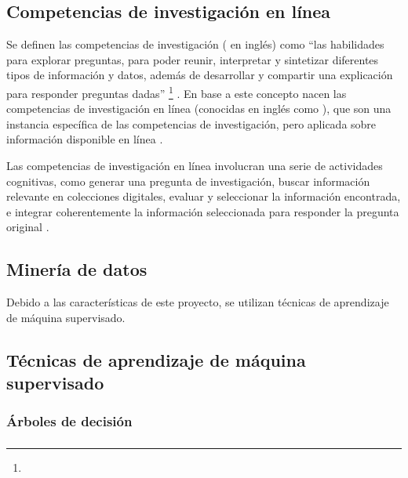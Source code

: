 \subsection{Competencias de investigación en línea}
\label{subsec:competencias}
Se definen las competencias de investigación ( en inglés) como “las habilidades para explorar preguntas, para poder reunir, interpretar y sintetizar diferentes tipos de información y datos, además de desarrollar y compartir una explicación para responder preguntas dadas” \footnote{\traduccionlibre} \parencite[p.~13]{national2000inquiry}. En base a este concepto nacen las competencias de investigación en línea (conocidas en inglés como ), que son una instancia específica de las competencias de investigación, pero aplicada sobre información disponible en línea \parencite{quintana2005framework}.

Las competencias de investigación en línea involucran una serie de actividades cognitivas, como generar una pregunta de investigación, buscar información relevante en colecciones digitales, evaluar y seleccionar la información encontrada, e integrar coherentemente la información seleccionada para responder la pregunta original \parencite{eisenberg1990information}.

\subsection{Minería de datos}


Debido a las características de este proyecto, se utilizan técnicas de aprendizaje de máquina supervisado.

\subsection{Técnicas de aprendizaje de máquina supervisado}
\label{subsec:tecnicas-mineria}

\subsubsection*{Árboles de decisión}

\begin{figure}[H]
	\centering
	
	\label{fig:decision-tree}
\end{figure}


\subsubsection*{}

